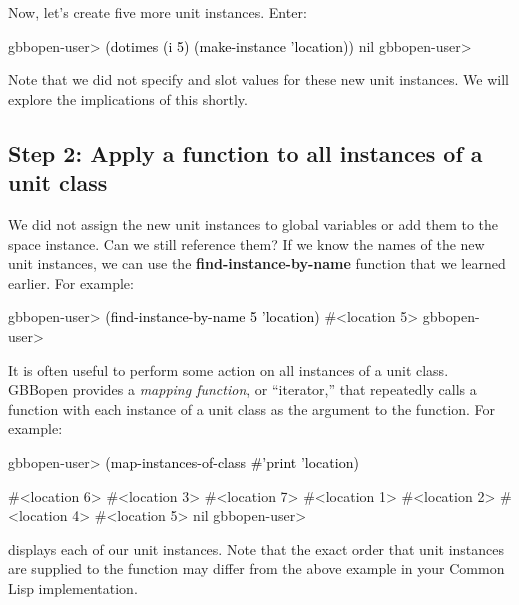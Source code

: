 \documentclass[10pt,twoside,english,pdftex]{article}
\begin{document}
Now, let's create five more  unit instances.  Enter:
%
%
%
\W\supp
\begin{example}
\textcolor{darkergray}{%
  gbbopen-user> \textcolor{black}{(dotimes (i 5) (make-instance 'location))}
  nil
  gbbopen-user>}
\end{example}
%
Note that we did not specify  and  slot values for these new
unit instances.  We will explore the implications of this shortly.

\subsection*{Step 2: Apply a function to all instances of a unit class}

%
%
%
%
We did not assign the new  unit instances to global variables
or add them to the  space instance.  Can we still reference
them?  If we know the names of the new unit instances, we can use the
\textbf{find-instance-by-name} function that we learned earlier.  For example:
%
\W\supp
\begin{example}
\textcolor{darkergray}{%
  gbbopen-user> \textcolor{black}{(find-instance-by-name 5 'location)}
  #<location 5>
  gbbopen-user>}
\end{example}

%
%
It is often useful to perform some action on all instances of a unit class.
GBBopen provides a \textit{mapping function}, or ``iterator,'' that repeatedly
calls a function with each instance of a unit class as the argument to the
function.  For example:
%
\W\supp
\begin{example}
\textcolor{darkergray}{%
  gbbopen-user> \textcolor{black}{(map-instances-of-class #'print 'location)}

  #<location 6> 
  #<location 3> 
  #<location 7> 
  #<location 1> 
  #<location 2> 
  #<location 4> 
  #<location 5> 
  nil
  gbbopen-user>}
\end{example}
%
displays each of our  unit instances.  Note that the exact
order that  unit instances are supplied to the 
function may differ from the above example in your Common Lisp implementation.
\end{document}
